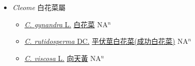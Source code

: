 
  \begin{itemize}
 \item[] \textit{Cleome} 白花菜屬
                    
  \begin{itemize}
        \item[] \href{http://www.theplantlist.org/tpl1.1/search?q=Cleome+gynandra}{\textit{C. gynandra} L.}   \href{\detokenize{http://taibnet.sinica.edu.tw/chi/taibnet_species_list.php?T2=白花菜&T2_new_value=true&fr=y}}{白花菜} NA$^n$
        \item[] \href{http://www.theplantlist.org/tpl1.1/search?q=Cleome+rutidosperma}{\textit{C. rutidosperma} DC.}   \href{\detokenize{http://taibnet.sinica.edu.tw/chi/taibnet_species_list.php?T2=平伏莖白花菜&T2_new_value=true&fr=y}}{平伏莖白花菜(成功白花菜)}   NA$^n$
        \item[] \href{http://www.theplantlist.org/tpl1.1/search?q=Cleome+viscosa}{\textit{C. viscosa} L.}   \href{\detokenize{http://taibnet.sinica.edu.tw/chi/taibnet_species_list.php?T2=向天黃&T2_new_value=true&fr=y}}{向天黃} NA$^n$
  \end{itemize}
  \end{itemize}
